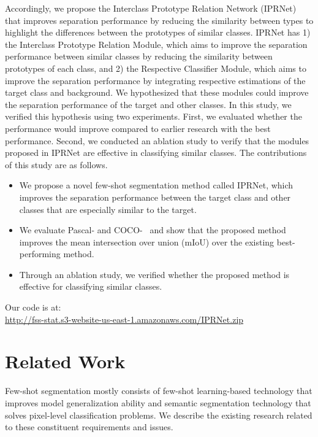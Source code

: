 \documentclass[runningheads]{llncs}
\begin{document}
Accordingly, we propose the Interclass Prototype Relation Network (IPRNet) that improves separation performance by reducing the similarity between types to highlight the differences between the prototypes of similar classes. IPRNet has 1) the Interclass Prototype Relation Module, which aims to improve the separation performance between similar classes by reducing the similarity between prototypes of each class, and 2) the Respective Classifier Module, which aims to improve the separation performance by integrating respective estimations of the target class and background. We hypothesized that these modules could improve the separation performance of the target and other classes. In this study, we verified this hypothesis using two experiments. First, we evaluated whether the performance would improve compared to earlier research with the best performance. Second, we conducted an ablation study to verify that the modules  proposed in IPRNet are effective in classifying similar classes. The contributions of this study are as follows.
\begin{itemize}
\item We propose a novel few-shot segmentation method called IPRNet, which improves the separation performance between the target class and other classes that are especially similar to the target.
\item We evaluate Pascal-\cite{Oneshot} and COCO-~\cite{coco} and show that the proposed method improves the mean intersection over union (mIoU) over the existing best-performing method.
\item Through an ablation study, we verified whether the proposed method is effective for classifying similar classes.
\end{itemize}
Our code is at:\\\url{http://fss-stat.s3-website-us-east-1.amazonaws.com/IPRNet.zip}
\section{Related Work}
Few-shot segmentation mostly consists of few-shot learning-based technology that improves model generalization ability and semantic segmentation technology that solves pixel-level classification problems.
We describe the existing research related to these constituent requirements and issues.
\end{document}

